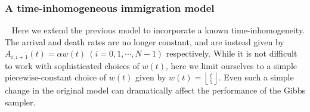 {\subsubsection{A time-inhomogeneous immigration model}~
Here we extend the previous model to incorporate a known time-inhomogeneity. 
The arrival and death rates are no longer constant, and are instead given by
$A_{i, i+1}(t) = \alpha w(t) \ (i =0,1,\cdots,N-1)$ respectively.
While it is not difficult to work with sophisticated choices of $w(t)$,
here we limit ourselves to a simple piecewise-constant choice of $w(t)$ 
given by $w(t) = \left\lfloor \frac{t}{5} \right\rfloor$. Even such a simple
change in the original model can dramatically affect the performance
of the Gibbs sampler.

}
